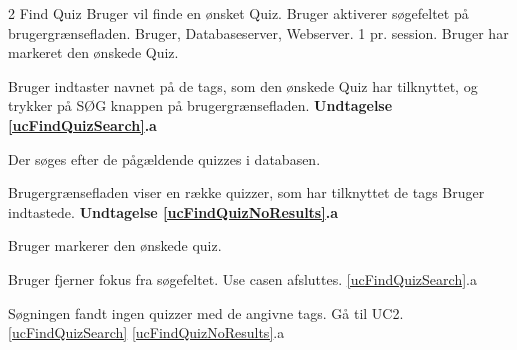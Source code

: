 \uchead
	{2}
	{Find Quiz}
	{Bruger vil finde en ønsket Quiz.}
	{Bruger aktiverer søgefeltet på brugergrænsefladen.}
	{Bruger, Databaseserver, Webserver.}
	{}
	{1 pr. session.}
	{Bruger har markeret den ønskede Quiz.}

\item \label{ucFindQuizSearch} Bruger indtaster navnet på de tags, som den ønskede Quiz har tilknyttet, og trykker på SØG knappen på brugergrænsefladen. 
\textbf{Undtagelse \ref{ucFindQuizSearch}.a}

\item Der søges efter de pågældende quizzes i databasen.

\item \label{ucFindQuizNoResults} Brugergrænsefladen viser en række quizzer, som har tilknyttet de tags Bruger indtastede.
\textbf{Undtagelse \ref{ucFindQuizNoResults}.a}

\item Bruger markerer den ønskede quiz.

\ucdescriptionend

\ucextension
	{Bruger fjerner fokus fra søgefeltet.}
	{Use casen afsluttes.}
	{\ref{ucFindQuizSearch}.a}

\ucextension
	{Søgningen fandt ingen quizzer med de angivne tags.}
	{Gå til UC2.\ref{ucFindQuizSearch}}
	{\ref{ucFindQuizNoResults}.a}
				
